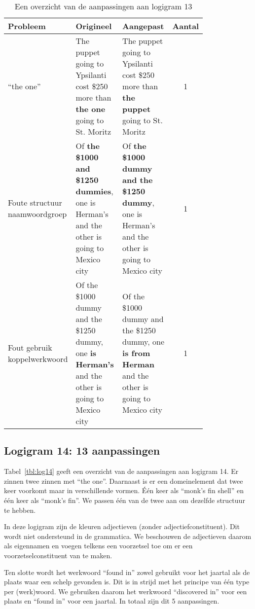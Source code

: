 \begin{table}[h]
  \centering
  \begin{tabular}{p{0.2\linewidth}p{0.3\linewidth}p{0.3\linewidth}c}
    \toprule
    \textbf{Probleem} & \textbf{Origineel} & \textbf{Aangepast} & \textbf{Aantal} \\ 
    \hline
    ``the one'' & The puppet going to Ypsilanti cost \$250 more than \textbf{the one} going to St. Moritz & The puppet going to Ypsilanti cost \$250 more than \textbf{the puppet} going to St. Moritz & 1 \\
    \hline
    Foute structuur naamwoordgroep & Of \textbf{the \$1000 and \$1250 dummies}, one is Herman's and the other is going to Mexico city & Of \textbf{the \$1000 dummy and the \$1250 dummy}, one is Herman's and the other is going to Mexico city & 1 \\
    \hline
    Fout gebruik koppelwerkwoord & Of the \$1000 dummy and the \$1250 dummy, one \textbf{is Herman's} and the other is going to Mexico city & Of the \$1000 dummy and the \$1250 dummy, one \textbf{is from Herman} and the other is going to Mexico city & 1 \\
    \bottomrule
  \end{tabular}
  \caption{Een overzicht van de aanpassingen aan logigram 13}
  \label{tbl:log13}
\end{table}

\subsection{Logigram 14: 13 aanpassingen}
Tabel~\ref{tbl:log14} geeft een overzicht van de aanpassingen aan logigram 14. Er zinnen twee zinnen met ``the one''. Daarnaast is er een domeinelement dat twee keer voorkomt maar in verschillende vormen. Één keer als ``monk's fin shell'' en één keer als ``monk's fin''. We passen één van de twee aan om dezelfde structuur te hebben.

In deze logigram zijn de kleuren adjectieven (zonder adjectiefconstituent). Dit wordt niet ondersteund in de grammatica. We beschouwen de adjectieven daarom als eigennamen en voegen telkens een voorzetsel toe om er een voorzetselconstituent van te maken.

Ten slotte wordt het werkwoord ``found in'' zowel gebruikt voor het jaartal als de plaats waar een schelp gevonden is. Dit is in strijd met het principe van één type per (werk)woord. We gebruiken daarom het werkwoord ``discovered in'' voor een plaats en ``found in'' voor een jaartal. In totaal zijn dit 5 aanpassingen.

